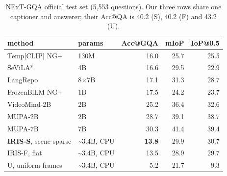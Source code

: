\documentclass[sigconf,review,anonymous]{acmart}
\begin{document}
\begin{table}[t]
\footnotesize
\setlength{\tabcolsep}{4pt}
\caption{NExT-GQA official test set (5,553 questions). Our three rows share one captioner and answerer; their Acc@QA is 40.2 (S), 40.2 (F) and 43.2 (U).}
\begin{tabular}{llrrr}
\toprule
method & params & Acc@GQA & mIoP & IoP@0.5 \\
\midrule
Temp{[}CLIP{]} NG+ & 130M & 16.0 & 25.7 & 25.5 \\
SeViLA* & 4B & 16.6 & 29.5 & 22.9 \\
LangRepo & 8\ensuremath{\times}7B & 17.1 & 31.3 & 28.7 \\
FrozenBiLM NG+ & 1B & 17.5 & 24.2 & 23.7 \\
VideoMind-2B & 2B & 25.2 & 36.4 & 32.6 \\
MUPA-2B & 2B & 28.7 & 39.1 & 38.7 \\
MUPA-7B & 7B & 30.3 & 41.4 & 39.4 \\
\midrule
\textbf{IRIS-S}, scene-sparse & \textasciitilde3.4B, CPU & \textbf{13.8} & 29.9 & 30.7 \\
IRIS-F, flat & \textasciitilde3.4B, CPU & 13.5 & 28.9 & 29.7 \\
U, uniform frames & \textasciitilde3.4B, CPU & 5.2 & 21.7 & 9.3 \\
\bottomrule
\end{tabular}
\end{table}
\end{document}

